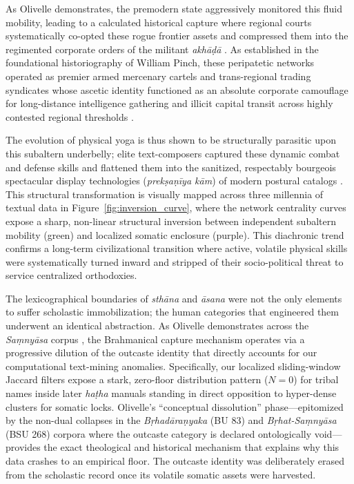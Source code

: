 \documentclass[11pt,twoside,letterpaper]{article}
\begin{document}
As Olivelle demonstrates, the premodern state aggressively monitored this fluid mobility, leading to a calculated historical capture where regional courts systematically co-opted these rogue frontier assets and compressed them into the regimented corporate orders of the militant \textit{akhāḍā} \citep{Clark2006, Olivelle1987}. As established in the foundational historiography of William Pinch, these peripatetic networks operated as premier armed mercenary cartels and trans-regional trading syndicates whose ascetic identity functioned as an absolute corporate camouflage for long-distance intelligence gathering and illicit capital transit across highly contested regional thresholds \citep{Pinch1996, Pinch2012}. 

The evolution of physical yoga is thus shown to be structurally parasitic upon this subaltern underbelly; elite text-composers captured these dynamic combat and defense skills and flattened them into the sanitized, respectably bourgeois spectacular display technologies (\textit{prekṣaṇīya kām}) of modern postural catalogs \citep{Birch2024, Danta2015}. This structural transformation is visually mapped across three millennia of textual data in Figure~\ref{fig:inversion_curve}, where the network centrality curves expose a sharp, non-linear structural inversion between independent subaltern mobility (green) and localized somatic enclosure (purple). This diachronic trend confirms a long-term civilizational transition where active, volatile physical skills were systematically turned inward and stripped of their socio-political threat to service centralized orthodoxies.
 
The lexicographical boundaries of \textit{sthāna} and \textit{āsana} were not the only elements to suffer scholastic immobilization; the human categories that engineered them underwent an identical abstraction. As Olivelle demonstrates across the \textit{Saṃnyāsa} corpus \cite{olivelle1992}, the Brahmanical capture mechanism operates via a progressive dilution of the outcaste identity that directly accounts for our computational text-mining anomalies. Specifically, our localized sliding-window Jaccard filters expose a stark, zero-floor distribution pattern ($N = 0$) for tribal names inside later \textit{haṭha} manuals standing in direct opposition to hyper-dense clusters for somatic locks. Olivelle's ``conceptual dissolution'' phase—epitomized by the non-dual collapses in the \textit{Bṛhadāraṇyaka} (BU 83) and \textit{Bṛhat-Saṃnyāsa} (BSU 268) corpora where the outcaste category is declared ontologically void—provides the exact theological and historical mechanism that explains why this data crashes to an empirical floor. The outcaste identity was deliberately erased from the scholastic record once its volatile somatic assets were harvested.
\end{document}
